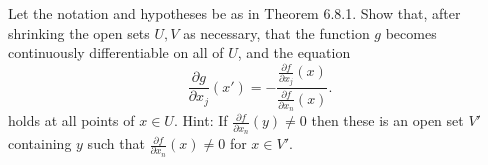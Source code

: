 \begin{problem}

Let the notation and hypotheses be as in Theorem \textup{6.8.1}. Show that, after shrinking
the open sets $U,V$ as necessary, that the function $g$ becomes continuously differentiable
on all of $U$, and the equation
\begin{equation*}%
\frac{\partial g}{\partial x_j}(x')
=
-\frac{\frac{\partial f}{\partial x_j}(x)}{\frac{\partial f}{\partial x_n}(x)}.
\end{equation*}
 holds at all points of $x\in U$.
 Hint: If $\frac{\partial f}{\partial x_n}(y) \neq 0$ then these is an open set $V'$ containing $y$
 such that $\frac{\partial f}{\partial x_n}(x) \neq 0$ for $x\in V'$.
 
\end{problem}


